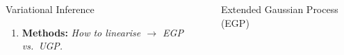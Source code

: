 \documentclass[final]{beamer}
\newlength{\onecolwid}
\newlength{\twocolwid}
\begin{document}
\begin{frame}[t]
\begin{columns}[t]
\begin{column}{\twocolwid}
\begin{columns}[t,totalwidth=\twocolwid]
\begin{column}{\onecolwid}
\begin{block}{Variational Inference}
\begin{enumerate}
\begin{align*}
 \pomean_{k+1} &= \brac{1-\step}\pomean_k + \step\prmean 
        + \step\Kgain_k\brac{\obs - \intcpt_k - \Linmat_k\prmean} \text{,} \\
    \pocov  &= \brac{\ident{N} - \Kgain_k\Linmat_k}\!\prcov,   
  \end{align*}        
where     $ \Kgain_k = \prcov\Linmat_k\transpose\brac{\lcov +
        \Linmat_k\prcov\Linmat_k\transpose}\inv$ .  
 \item
\textbf{Methods:} \emph{How to linearise $\rightarrow$ EGP vs.~UGP.}
\end{enumerate}
%
\end{block}




\end{column} %

\begin{column}{\onecolwid}\vspace{-.6in} %



\begin{block}{Extended Gaussian Process (EGP)}
    

\end{block}
\end{column}
\end{columns}
\end{column}
\end{columns}
\end{frame}
\end{document}
